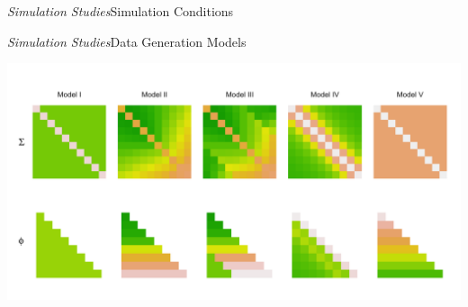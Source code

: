 \begin{frame}{\emph{Simulation Studies}}{Simulation Conditions}

\end{frame}



\begin{frame}[c]{\emph{Simulation Studies}}{Data Generation Models}

\begin{center}
  \includegraphics[width = \textwidth]{img/chapter-4/cov-cholesky-grid-beamer}%
\end{center}

\end{frame}

